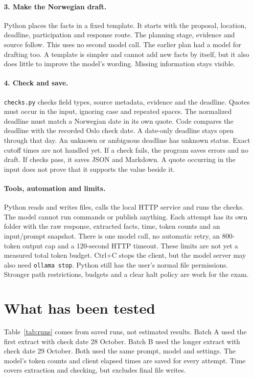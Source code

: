 \documentclass{article}
\begin{document}
\paragraph{3. Make the Norwegian draft.}
Python places the facts in a fixed template. It starts with the proposal, location,
deadline, participation and response route. The planning stage, evidence and source
follow. This uses no second model call. The earlier plan had a model for drafting
too. A template is simpler and cannot add new facts by itself, but it also does
little to improve the model's wording. Missing information stays visible.

\paragraph{4. Check and save.}
\texttt{checks.py} checks field types, source metadata, evidence and the deadline.
Quotes must occur in the input, ignoring case and repeated spaces. The normalized
deadline must match a Norwegian date in its own quote. Code compares the deadline
with the recorded Oslo check date. A date-only deadline stays open through that
day. An unknown or ambiguous deadline has unknown status. Exact cutoff times are
not handled yet. If a check fails, the program saves errors and no draft.
If checks pass, it saves JSON and Markdown. A quote occurring in the input does
not prove that it supports the value beside it.

\paragraph{Tools, automation and limits.}
Python reads and writes files, calls the local HTTP service and runs the checks.
The model cannot run commands or publish anything. Each attempt has its own folder
with the raw response, extracted facts, time, token counts and an input/prompt
snapshot. There is one model call, no automatic retry, an 800-token output cap and
a 120-second HTTP timeout. These limits are not yet a measured total token budget.
Ctrl+C stops the client, but the model server may also need \texttt{ollama stop}.
Python still has the user's normal file permissions. Stronger path restrictions,
budgets and a clear halt policy are work for the exam.

\section{What has been tested}
Table~\ref{tab:runs} comes from saved runs, not estimated results. Batch A used
the first extract with check date 28 October. Batch B used the longer extract
with check date 29 October. Both used the same prompt, model and settings.
The model's token counts and client elapsed times are saved for every attempt.
Time covers extraction and checking, but excludes final file writes.
\end{document}
